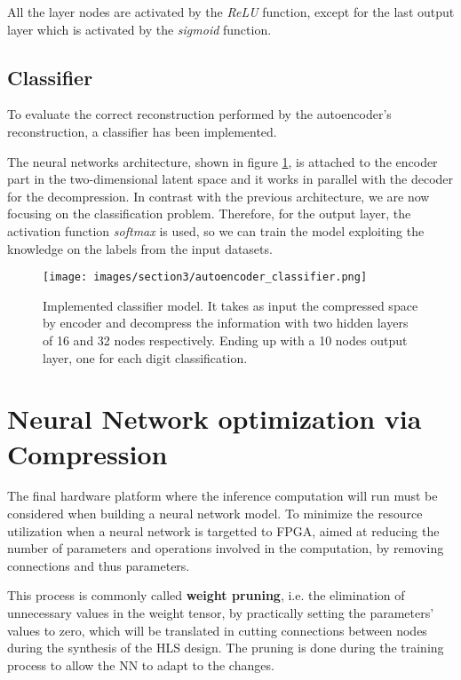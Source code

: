 \documentclass{article}
\begin{document}
\par All the layer nodes are activated by the \textit{ReLU} function, 
except for the last output layer which is activated by the \textit{sigmoid} function. 



\subsection{Classifier}

To evaluate the correct reconstruction performed by the autoencoder's reconstruction, a classifier has been implemented.
\par The neural networks architecture, shown in figure \ref{fig:classifier}, is attached to the encoder part in the two-dimensional
latent space and it works in parallel with the decoder for the decompression. 
In contrast with the previous architecture, we are now focusing on the classification problem. 
Therefore, for the output layer, the activation function \textit{softmax} is used, so we can train the model exploiting 
the knowledge on the labels from the input datasets.

\begin{figure}[H]
  \centering
  \texttt{[image: images/section3/autoencoder\_classifier.png]}
  \caption{Implemented classifier model. It takes as input the compressed space by encoder
  and decompress the information with two hidden layers of 16 and 32 nodes respectively. 
  Ending up with a 10 nodes output layer, one for each digit classification.}
  \label{fig:classifier}
  \end{figure}

\section{Neural Network optimization via Compression}

The final hardware platform where the inference computation will run must be considered when building a neural network model. 
To minimize the resource utilization when a neural network is targetted to FPGA, 
aimed at reducing the number of parameters and operations involved in the computation, 
by removing connections and thus parameters.

\par This process is commonly called \textbf{weight pruning}, i.e. the elimination of unnecessary values in the weight tensor, 
by practically setting the parameters' values to zero, which will be translated in cutting connections between nodes 
during the synthesis of the HLS design. 
The pruning is done during the training process to allow the NN to adapt to the changes.
\end{document}
